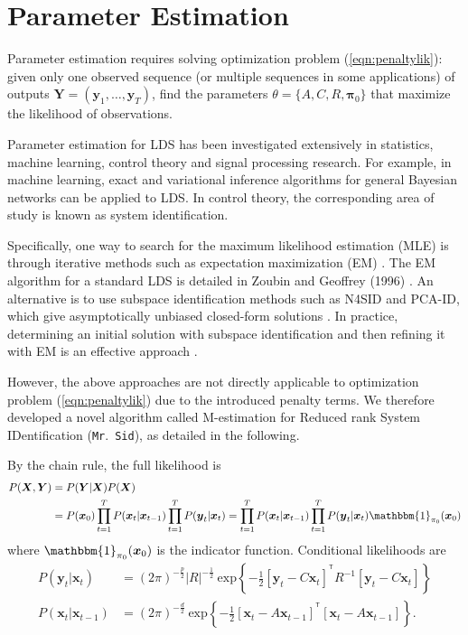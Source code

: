 \documentclass[fleqn,12pt]{article}
\let\oldref\ref
\renewcommand{\ref}[1]{(\oldref{#1})}
\newcommand{\T}{^{\ensuremath{\mathsf{T}}}}           %
\newcommand{\mrsid}{{\sc \texttt{Mr}.~\texttt{Sid}}}
\providecommand{\mb}[1]{\boldsymbol{#1}}
\newcommand{\bx}{\mb{x}}
\newcommand{\by}{\mb{y}}
\newcommand{\bX}{\mb{X}}
\newcommand{\bY}{\mb{Y}}
\begin{document}
\section{Parameter Estimation}
Parameter estimation requires solving optimization problem \ref{eqn:penaltylik}: given only one observed sequence (or multiple sequences in some applications) of outputs $\bY=(\by_1,\ldots,\by_T)$, find the parameters $\theta=\{A,C,R,\mathbf{\pi}_0\}$ that maximize the likelihood of observations.

Parameter estimation for LDS has been investigated extensively in statistics, machine learning, control theory and signal processing research. For example, in machine learning, exact and variational inference algorithms for general Bayesian networks can be applied to LDS. In control theory, the corresponding area of study is known as system identification.

Specifically, one way to search for the maximum likelihood estimation (MLE) is through iterative methods such as expectation maximization (EM) \citep{shumway1982approach}. The EM algorithm for a standard LDS is detailed in Zoubin and Geoffrey (1996) \citep{ghahramani1996parameter}. An alternative is to use subspace identification methods such as N4SID and PCA-ID, which give asymptotically unbiased closed-form solutions \citep{van1994n4sid,doretto2003dynamic}. In practice, determining an initial solution with subspace identification and then refining it with EM is an effective approach \citep{bootslearning}.

However, the above approaches are not directly applicable to optimization problem \ref{eqn:penaltylik} due to the introduced penalty terms. We therefore developed a novel algorithm called M-estimation for Reduced rank System IDentification (\mrsid), as detailed in the following.

By the chain rule, the full likelihood is
\begin{equation*}\label{eqn:likelihood}
\begin{aligned}
P(\bX,\bY)&=P(\bY|\bX) P(\bX)\\
&= P(\bx_0)\prod\limits_{t=1}^{T}P(\bx_t|\bx_{t-1})\prod\limits_{t=1}^{T} P(\by_t|\bx_t)=\prod\limits_{t=1}^{T}P(\bx_t|\bx_{t-1})\prod\limits_{t=1}^{T} P(\by_t|\bx_t)\mathbbm{1}_{\mathbf{\pi}_0}(\bx_0)
\end{aligned}
\end{equation*}
where $\mathbbm{1}_{\mathbf{\pi}_0}(\bx_0)$ is the indicator function. Conditional likelihoods are
\begin{equation*}\label{eqn:condlik}
\begin{aligned}
P(\by_t|\bx_t)&= (2\pi)^{-\frac{p}{2}}|R|^{-\frac{1}{2}}\  \text{exp}\left\{-\frac{1}{2}[\by_t-C\bx_t]^{\T}R^{-1}[\by_t-C\bx_t]\right\}\\
P(\bx_t|\bx_{t-1})
&=(2\pi)^{-\frac{d}{2}}\  \text{exp}\left\{-\frac{1}{2}[\bx_t-A\bx_{t-1}]^{\T}[\bx_t-A\bx_{t-1}]\right\}.
\end{aligned}
\end{equation*}
\end{document}
